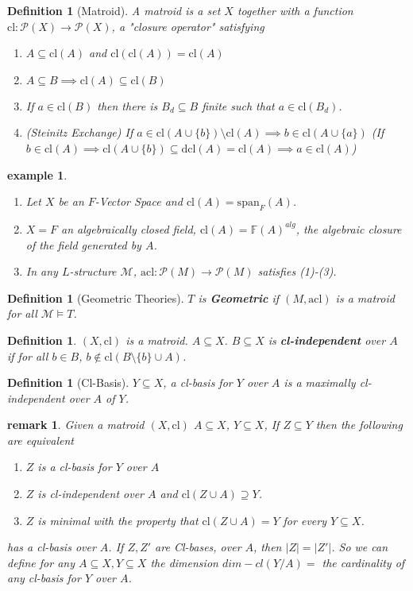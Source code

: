 \documentclass[letterpaper, 12pt]{article}
\newcommand{\fin}{\qquad \quad \hfill \framebox[1.75mm][l]{\,}}
\newcommand{\cM}{\mathcal{M}}
\newcommand{\bF}{\mathbb{F}}
\newcommand{\cP}{\mathcal{P}}
\newcommand{\acl}{\mbox{acl}}
\newcommand{\cl}{\mbox{cl}}
\theoremstyle{stdthm}
\theoremstyle{stddef}
\newtheorem{defn}[thm]{Definition}
\newtheorem{rem}[thm]{remark} %
\newtheorem{eg}[thm]{example} %
\theoremstyle{stdnonum}
\theoremstyle{stdqands}
\theoremstyle{stdbold}
\begin{document}
\begin{defn}[Matroid]
A matroid is a set $X$ together with a function $\mbox{cl}:\cP(X) \to \cP(X)$, a "closure operator" satisfying 
\begin{enumerate}
\item $A \subseteq \mbox{cl}(A)$ and $\cl(\cl(A)) = \cl(A)$ 
\item $A\subseteq B \implies \cl(A) \subseteq \cl(B)$ 
\item If $a \in \cl(B)$ then there is $B_d \subseteq B$ finite such that $a \in \cl(B_d)$. 
\item (Steinitz Exchange) If $a \in \cl(A \cup \{b\}) \setminus \cl(A) \implies b \in \cl(A \cup \{a\})$ (If $b \in \cl(A) \implies \cl(A \cup \{b\}) \subseteq \mbox{dcl}(A) = \cl(A) \implies a \in \cl(A)$)
\end{enumerate}
\end{defn}

\begin{eg}
\begin{enumerate}
\item Let $X$ be an $F$-Vector Space and $\cl(A) = \mbox{span}_F(A)$. 
\item $X = F$ an algebraically closed field, $\cl(A) = \bF(A)^{alg}$, the algebraic closure of the field generated by $A$. 
\item In any $L$-structure $\cM$, $\acl: \cP(M) \to \cP(M)$ satisfies (1)-(3). 
\end{enumerate}

\end{eg}

\begin{defn}[Geometric Theories]
$T$ is {\bf Geometric} if $(M,\acl)$ is a matroid for all $\cM \models T$. 
\end{defn}

\begin{defn}
$(X,\cl)$ is a matroid. $A \subseteq X$.  $B \subseteq X$ is {\bf cl-independent} over $A$ if for all $b \in B$, $b \notin \cl(B \setminus \{b\} \cup A)$. 
\end{defn}

\begin{defn} [Cl-Basis]
$Y \subseteq X$,  a cl-basis for $Y$ over $A$ is a maximally cl-independent over $A$ of $Y$. 
\end{defn}

\begin{rem}
Given a matroid $(X,\cl)$ $A \subseteq X$, $Y \subseteq X$, If $Z \subseteq Y$  then the following are equivalent 
\begin{enumerate}
\item $Z$ is a cl-basis for $Y$ over $A$ 
\item $Z$ is cl-independent over $A$ and $\cl(Z \cup A) \supseteq Y$. 
\item $Z$ is minimal with the property that $\cl(Z \cup A) = Y$ for every $Y \subseteq X$.  
\end{enumerate}
has a cl-basis over $A$. If $Z,Z'$ are Cl-bases, over $A$, then $|Z| = |Z'|$. So we can define for any $A\subseteq X, Y \subseteq X$ the dimension $dim-cl(Y/A) = $ the cardinality of any cl-basis for $Y$ over $A$.  
\end{rem}
\end{document}
